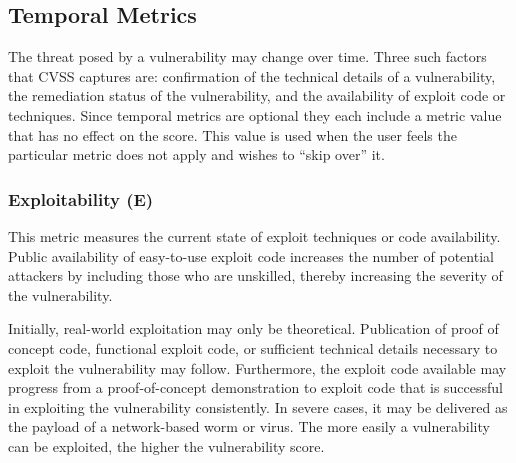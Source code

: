     \subsection{Temporal Metrics}\label{subsec:temporal-metrics}

      The threat posed by a vulnerability may change over time. Three such
      factors that CVSS captures are: confirmation of the technical details of
      a vulnerability, the remediation status of the vulnerability, and the
      availability of exploit code or techniques. Since temporal metrics are
      optional they each include a metric value that has no effect on the
      score. This value is used when the user feels the particular metric does
      not apply and wishes to ``skip over'' it.

      \subsubsection{Exploitability (E)}\label{subsubsec:exploitability-e}

        This metric measures the current state of exploit techniques or code
        availability. Public availability of easy-to-use exploit code increases
        the number of potential attackers by including those who are unskilled,
        thereby increasing the severity of the vulnerability.

        Initially, real-world exploitation may only be theoretical. Publication
        of proof of concept code, functional exploit code, or sufficient
        technical details necessary to exploit the vulnerability may follow.
        Furthermore, the exploit code available may progress from a
        proof-of-concept demonstration to exploit code that is successful in
        exploiting the vulnerability consistently. In severe cases, it may be
        delivered as the payload of a network-based worm or virus. The more
        easily a vulnerability can be exploited, the higher the vulnerability
        score.

